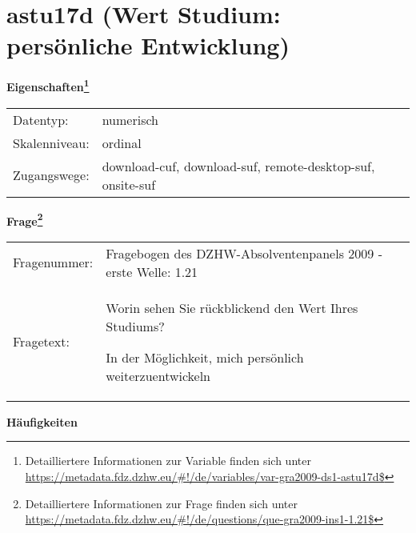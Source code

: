 
    \setcounter{footnote}{0}

    \vspace*{-1.8cm}
	\section{astu17d (Wert Studium: persönliche Entwicklung)}
	\label{section:astu17d}



    \vspace*{0.5cm}
    \noindent\textbf{Eigenschaften\footnote{Detailliertere Informationen zur Variable finden sich unter
		\url{https://metadata.fdz.dzhw.eu/\#!/de/variables/var-gra2009-ds1-astu17d$}}}\\
	\begin{tabularx}{\hsize}{@{}lX}
	Datentyp: & numerisch \\
	Skalenniveau: & ordinal \\
	Zugangswege: &
	  download-cuf, 
	  download-suf, 
	  remote-desktop-suf, 
	  onsite-suf
 \\
    \end{tabularx}



				\vspace*{0.5cm}
                \noindent\textbf{Frage\footnote{Detailliertere Informationen zur Frage finden sich unter
		              \url{https://metadata.fdz.dzhw.eu/\#!/de/questions/que-gra2009-ins1-1.21$}}}\\
				\begin{tabularx}{\hsize}{@{}lX}
					Fragenummer: &
					  Fragebogen des DZHW-Absolventenpanels 2009 - erste Welle:
					  1.21
 \\
					Fragetext: & Worin sehen Sie rückblickend den Wert Ihres Studiums?\par  In der Möglichkeit, mich persönlich weiterzuentwickeln \\
				\end{tabularx}





        		\vspace*{0.5cm}
                \noindent\textbf{Häufigkeiten}

